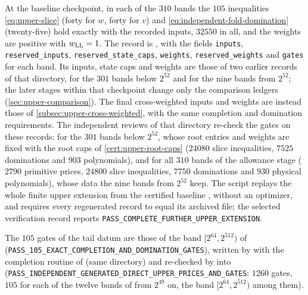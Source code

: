 \begin{certificate}\label{cert:upper-completion}
At the baseline checkpoint, in each of the $310$ bands the $105$ inequalities \eqref{eq:upper-slice} (forty for
$w$, forty for $v$) and \eqref{eq:independent-fold-domination} (twenty-five) hold
exactly with the recorded inputs, $32550$ in all, and the weights are positive with
$w_{\rm LL}=1$. The record is
, with the fields
\texttt{inputs}, \texttt{reserved\_inputs}, \texttt{reserved\_state\_caps},
\texttt{weights}, \texttt{reserved\_weights} and \texttt{gates} for each band. Its
inputs, state caps and weights are those of two earlier records of that directory,
 for the $301$ bands below $2^{52}$ and
 for the nine bands from $2^{52}$; the later
stages within that checkpoint change only the comparison ledgers
(\cref{sec:upper-comparison}). The final cross-weighted inputs and weights
are instead those of \cref{subsec:upper-cross-weighted}, with the same
completion and domination requirements. The
independent reviews of that directory re-check the gates on these records:
 for the $301$ bands below $2^{52}$, whose root entries
and weights are fixed with the root caps of \cref{cert:upper-root-caps} ($24080$ slice
inequalities, $7525$ dominations and $903$ polynomials), and
 for all $310$ bands of the allowance stage
($2790$ primitive prices, $24800$ slice inequalities, $7750$ dominations and $930$
physical polynomials), whose data the nine bands from $2^{52}$ keep. The script
 replays the whole finite upper
extension from the certified baseline
, without an optimizer,
and requires every regenerated record to equal its archived file; the selected
verification record 
reports \texttt{PASS\_COMPLETE\_FURTHER\_UPPER\_EXTENSION}.

The $105$ gates of the tail datum are those of the band $[2^{64},2^{512})$ of
(\texttt{PASS\_105\_EXACT\_COMPLETION\_AND\_DOMINATION\_GATES}), written by
 with the completion routine of
 (same directory) and re-checked by
 into
(\texttt{PASS\_INDEPENDENT\_GENERATED\_DIRECT\_UPPER\_PRICES\_AND\_GATES}: $1260$
gates, $105$ for each of the twelve bands of  from $2^{49}$
on, the band $[2^{64},2^{512})$ among them).
\end{certificate}

